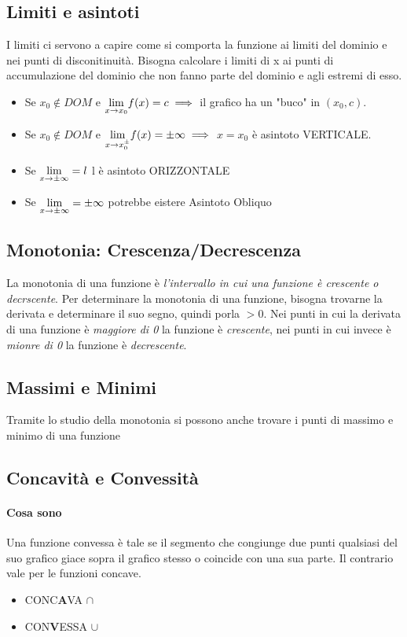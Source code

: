 \documentclass[12pt, a4paper, openany]{book}
\begin{document}
\subsection*{Limiti e asintoti}
I limiti ci servono a capire come si comporta la funzione ai limiti del dominio e nei punti di disconitinuità.
Bisogna calcolare i limiti di x ai punti di accumulazione del dominio che non fanno parte del dominio e agli estremi di esso.

\begin{itemize}
	\item Se $x_0 \notin DOM$ e $\underset{x \to x_0}{\lim} f(x) = c \implies$ il grafico ha un "buco" in $(x_0,c)$.
 \item Se $x_0 \notin DOM$ e $\underset{x \to x_{0}^\pm}{\lim} f(x) = \pm \infty \implies$ $x=x_0$ è asintoto VERTICALE.
 \item Se $\underset{x \to \pm \infty}{\lim} = l$ l è asintoto ORIZZONTALE
 \item Se $\underset{x \to \pm \infty}{\lim} = \pm \infty$ potrebbe eistere Asintoto Obliquo
\end{itemize}
\subsection*{Monotonia: Crescenza/Decrescenza}
La monotonia di una funzione è \emph{l'intervallo in cui una funzione è crescente o decrscente}.
Per determinare la monotonia di una funzione, bisogna trovarne la derivata e determinare il suo segno, quindi porla $>0$.
Nei punti in cui la derivata di una funzione è \emph{maggiore di 0} la funzione è \emph{crescente}, nei punti in cui invece è \emph{mionre di 0} la funzione è \emph{decrescente}.

\subsection*{Massimi e Minimi}
Tramite lo studio della monotonia si possono anche trovare i punti di massimo e minimo di una funzione %

\subsection*{Concavità e Convessità}
\paragraph*{Cosa sono} Una funzione convessa è tale se il segmento che congiunge due punti qualsiasi del suo grafico giace 
sopra il grafico stesso o coincide con una sua parte. Il contrario vale per le funzioni concave.
\begin{itemize}
	\item CONC\textbf{A}VA $\cap$
	\item CON\textbf{V}ESSA $\cup$
\end{itemize}
\end{document}

